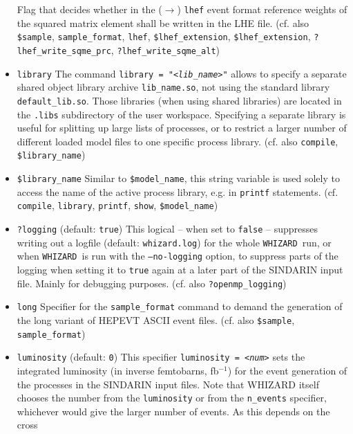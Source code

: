 \documentclass[12pt]{book}
\newcommand{\ttt}[1]{\texttt{#1}}
\newcommand{\whizard}{\texttt{WHIZARD}}
\begin{document}
\begin{itemize}
Flag that decides whether in the ($\to$) \ttt{lhef} event format
reference weights of the squared matrix element shall be written in
the LHE file. (cf. also \ttt{\$sample}, \ttt{sample\_format},
\ttt{lhef}, \ttt{\$lhef\_extension}, \ttt{\$lhef\_extension},
\ttt{?lhef\_write\_sqme\_prc}, \ttt{?lhef\_write\_sqme\_alt})   
\item
\ttt{library} \newline
The command \ttt{library = "{\em <lib\_name>}"} allows to specify a separate
shared object library archive \ttt{lib\_name.so}, not using the
standard library \ttt{default\_lib.so}. Those libraries (when using
shared libraries) are located in the \ttt{.libs} subdirectory of the
user workspace. Specifying a separate library is useful for splitting
up large lists of processes, or to restrict a larger number of
different loaded model files to one specific process library.
(cf. also \ttt{compile}, \ttt{\$library\_name})
\item
\ttt{\$library\_name} \newline
Similar to \ttt{\$model\_name}, this string variable is used solely to
access the name of the active process library, e.g. in \ttt{printf}
statements. (cf. \ttt{compile}, \ttt{library}, \ttt{printf},
\ttt{show}, \ttt{\$model\_name}) 
\item
\ttt{?logging} \qquad (default: \ttt{true}) \newline
This logical -- when set to \ttt{false} -- suppresses writing out a
logfile (default: \ttt{whizard.log}) for the whole \whizard\ run,
or when \whizard\ is run with the \ttt{--no-logging} option, to
suppress parts of the logging when setting it to \ttt{true} again at a
later part of the SINDARIN input file. Mainly for debugging purposes. 
(cf. also \ttt{?openmp\_logging})
\item
\ttt{long} \newline 
Specifier for the \ttt{sample\_format} command to demand the
generation of the long variant of HEPEVT ASCII event
files. (cf. also \ttt{\$sample}, 
\ttt{sample\_format}) 
\item
\ttt{luminosity} \qquad (default: \ttt{0}) \newline
This specifier \ttt{luminosity = {\em <num>}} sets the integrated luminosity
(in inverse femtobarns, fb${}^{-1}$) for the event generation of the
processes in the SINDARIN input 
files. Note that WHIZARD itself chooses the number from the
\ttt{luminosity} or from the \ttt{n\_events} specifier, whichever
would give the larger number of events. As this depends on the cross

\end{itemize}
\end{document}

